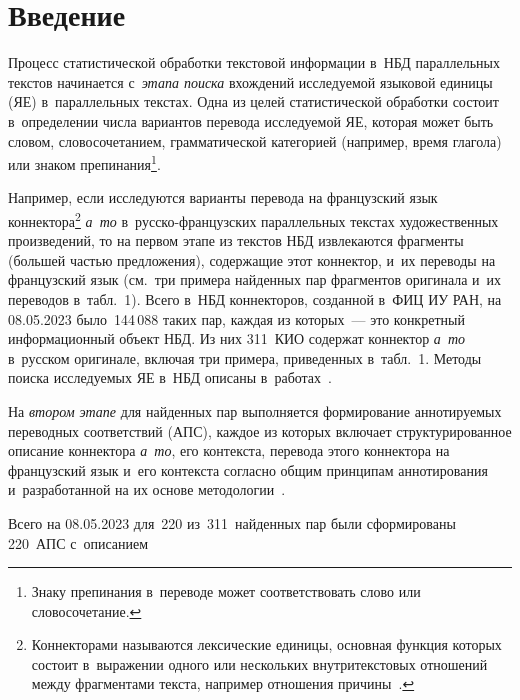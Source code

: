 \begin{multicols}{2}

\label{st\stat}
   

\section{Введение}

\vspace*{-3pt}

  Процесс статистической обработки текс\-то\-вой информации в~НБД
параллельных текс\-тов начинается с~\textit{этапа поиска} вхож\-де\-ний 
ис\-сле\-ду\-емой языковой единицы (ЯЕ) в~параллельных текс\-тах. Одна из целей 
статистической обработки со\-сто\-ит в~определении чис\-ла вариантов перевода 
исследуемой ЯЕ, которая может быть словом, словосочетанием, грамматической 
категорией (например, время глагола) или знаком препинания\footnote[3]{Знаку 
препинания в~переводе может соответствовать слово или словосочетание.}.
  
  Например, если исследуются варианты перевода на французский язык 
коннектора\footnote[4]{Коннекторами называются лексические единицы, основная функция которых состоит 
в~выражении одного или нескольких внут\-ри\-текс\-то\-вых отношений между фрагментами текс\-та, например 
отношения причины~\cite{1-zac}.} \textit{а~то} в~рус\-ско-фран\-цуз\-ских параллельных 
текстах художественных произведений, то на первом этапе из текс\-тов 
НБД извлекаются фраг\-мен\-ты (большей частью пред\-ло\-же\-ния), 
содержащие этот коннектор, и~их переводы на французский язык (см.\ три примера 
найденных пар фрагментов оригинала и~их переводов в~табл.~1). Всего в~НБД 
коннекторов, созданной в~ФИЦ ИУ РАН, на 08.05.2023 было~144\,088 таких пар, 
каждая из которых~--- это конкретный информационный объект НБД. Из 
них 311~КИО содержат коннектор \textit{а~то} в~русском оригинале, включая три 
примера, приведенных в~табл.~1. Методы поиска ис\-сле\-ду\-емых ЯЕ в~НБД описаны в~работах~\cite{2-zac, 3-zac, 4-zac}.

   
  На \textit{втором этапе} для найденных пар выполняется формирование 
аннотируемых переводных соответствий (АПС), каж\-дое из которых включает 
структурированное описание коннектора \textit{а~то}, его кон\-текс\-та, перевода 
этого коннектора на французский язык и~его кон\-текс\-та со\-глас\-но общим 
принципам аннотирования~\cite{5-zac} и~разработанной на их основе 
методологии~\cite{3-zac}.
  
  Всего на 08.05.2023 для~220 из~311~найденных пар были сформированы 
220~АПС с~описанием\linebreak\vspace*{-12pt}

\pagebreak

\end{multicols}

